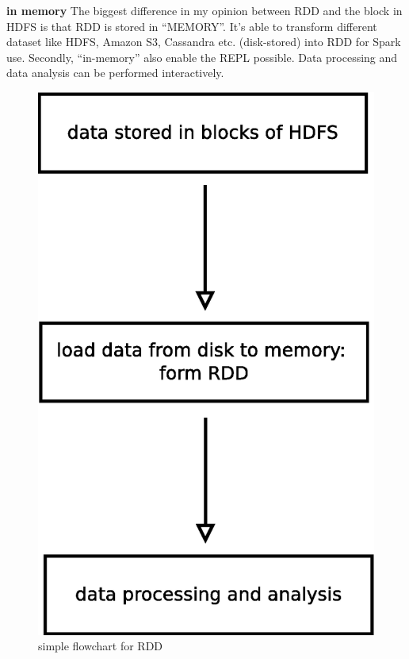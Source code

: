 \documentclass[notheorems, aspectratio=54]{beamer}
\begin{document}
\begin{frame}

\begin{block}{\textbf{in memory}}
 The biggest difference in my opinion between RDD and the block in HDFS is that RDD is stored in ``MEMORY''. It's able to transform
 different dataset like HDFS, Amazon S3, Cassandra etc. (disk-stored) into RDD for Spark use. Secondly, ``in-memory'' also enable the REPL possible. Data processing and data analysis can be performed interactively. 
\end{block}

\begin{figure}
 \includegraphics[scale=0.2]{rdd1}
\caption{simple flowchart for RDD}
\end{figure} 

 
\end{frame}


\begin{frame}

 

\end{frame}


\begin{frame}

  
\end{frame}

\begin{frame}

  
\end{frame}
\end{document}

